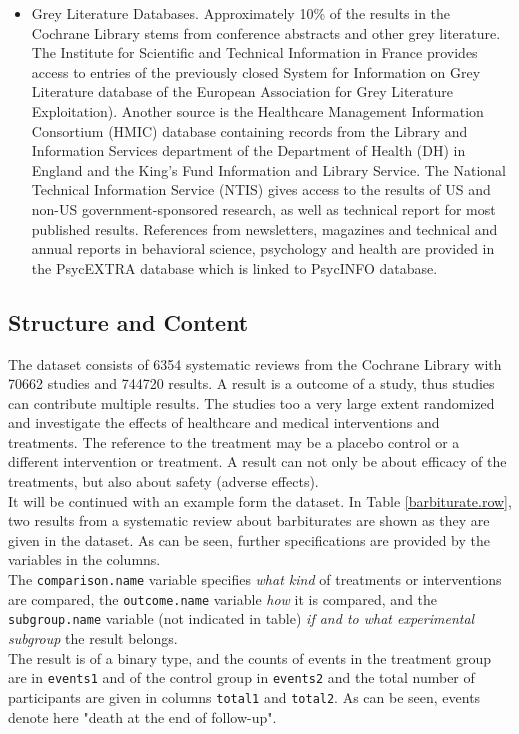 \documentclass[11pt,a4paper,twoside]{book}\usepackage[]{graphicx}\usepackage[]{color}
\begin{document}
\begin{itemize}
\item Grey Literature Databases. Approximately 10\% of the results in the Cochrane Library stems from conference abstracts and other grey literature. The Institute for Scientific and Technical Information in France provides access to entries of the previously closed System for Information on Grey Literature database of the European Association for Grey Literature Exploitation). Another source is the Healthcare Management Information Consortium (HMIC) database containing records from the Library and Information Services department of the Department of Health (DH) in England and the King's Fund Information and Library Service. The National Technical Information Service (NTIS) gives access to the results of US and non-US government-sponsored research, as well as technical report for most published results. References from newsletters, magazines and technical and annual reports in behavioral science, psychology and health are provided in the PsycEXTRA database which is linked to PsycINFO database.
\end{itemize}


\subsection{Structure and Content}
The dataset consists of 6354 systematic reviews from the Cochrane Library with 70662 studies and 744720 results. A result is a outcome of a study, thus studies can contribute multiple results. The studies too a very large extent randomized and investigate the effects of healthcare and medical interventions and treatments. The reference to the treatment may be a placebo control or a different intervention or treatment. A result can not only be about efficacy of the treatments, but also about safety (adverse effects).\\
It will be continued with an example form the dataset. In Table \ref{barbiturate.row}, two results from a systematic review about barbiturates are shown as they are given in the dataset. As can be seen, further specifications are provided by the variables in the columns. \\
The \texttt{comparison.name} variable specifies \textit{what kind} of treatments or interventions are compared, the \texttt{outcome.name} variable \textit{how} it is compared, and the \texttt{subgroup.name} variable (not indicated in table) \textit{if and to what experimental subgroup} the result belongs. \\
The result is of a binary type, and the counts of events in the treatment group are in \texttt{events1} and of the control group in \texttt{events2} and the total number of participants are given in columns \texttt{total1} and \texttt{total2}. As can be seen, events denote here "death at the end of follow-up".
\end{document}
